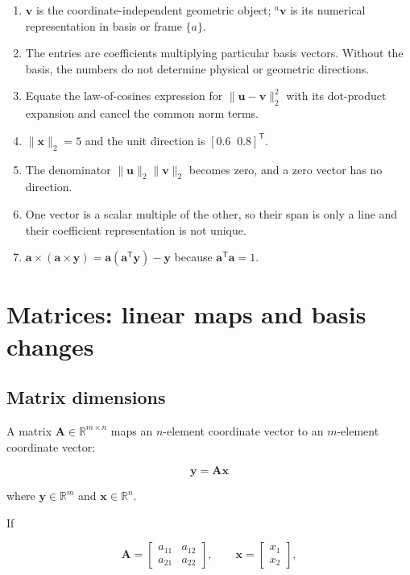 \documentclass[
  australian,
  12pt,
  letterpaper,
  DIV=11,
  numbers=noendperiod,
  twoside]{scrreprt}
\providecommand{\tightlist}{%
  \setlength{\itemsep}{0pt}\setlength{\parskip}{0pt}}
\begin{document}
\begin{enumerate}
\def\labelenumi{\arabic{enumi}.}
\tightlist
\item
  \(\mathbf v\) is the coordinate-independent geometric object;
  \({}^{a}\mathbf v\) is its numerical representation in basis or frame
  \(\{a\}\).
\item
  The entries are coefficients multiplying particular basis vectors.
  Without the basis, the numbers do not determine physical or geometric
  directions.
\item
  Equate the law-of-cosines expression for
  \(\|\mathbf u-\mathbf v\|_2^2\) with its dot-product expansion and
  cancel the common norm terms.
\item
  \(\|\mathbf x\|_2=5\) and the unit direction is
  \([0.6\;\;0.8]^\mathsf T\).
\item
  The denominator \(\|\mathbf u\|_2\|\mathbf v\|_2\) becomes zero, and a
  zero vector has no direction.
\item
  One vector is a scalar multiple of the other, so their span is only a
  line and their coefficient representation is not unique.
\item
  \(\mathbf a\times(\mathbf a\times\mathbf y)=\mathbf a(\mathbf a^\mathsf T\mathbf y)-\mathbf y\)
  because \(\mathbf a^\mathsf T\mathbf a=1\).
\end{enumerate}

\section{Matrices: linear maps and basis
changes}\label{matrices-linear-maps-and-basis-changes}

\subsection{Matrix dimensions}\label{matrix-dimensions}

A matrix \(\mathbf{A}\in\mathbb{R}^{m\times n}\) maps an \(n\)-element
coordinate vector to an \(m\)-element coordinate vector:

\[
\mathbf{y}=\mathbf{A}\mathbf{x}
\]

where \(\mathbf{y} \in \mathbb{R}^m\) and
\(\mathbf{x} \in \mathbb{R}^n\).

If

\[
\mathbf{A}=
\begin{bmatrix}
a_{11} & a_{12} \\
a_{21} & a_{22}
\end{bmatrix},
\qquad
\mathbf{x}=
\begin{bmatrix}
x_1\\
x_2
\end{bmatrix},
\]
\end{document}
